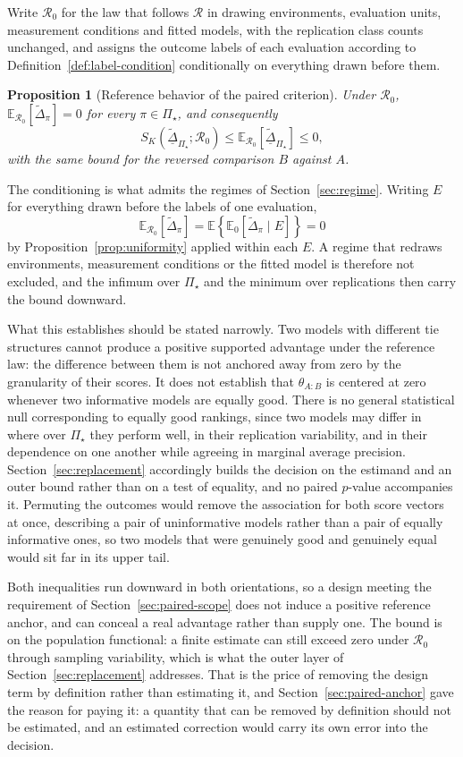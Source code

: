 \documentclass[11pt]{article}
\newcommand{\Regime}{\mathcal{R}}
\newcommand{\PSet}{\Pi_\star}
\newcommand{\E}{\mathbb{E}}
\newcommand{\Dta}{\widetilde{\Delta}}
\newcommand{\RobDta}{\underline{\widetilde{\Delta}}_{\PSet}}
\newtheorem{proposition}{Proposition}
\theoremstyle{remark}
\begin{document}
Write $\Regime_0$ for the law that follows $\Regime$ in drawing environments, evaluation units, measurement conditions and fitted models, with the replication class counts unchanged, and assigns the outcome labels of each evaluation according to Definition~\ref{def:label-condition} conditionally on everything drawn before them.

\begin{proposition}[Reference behavior of the paired criterion]
\label{prop:conservative}
Under $\Regime_0$, $\E_{\Regime_0}[\Dta_\pi]=0$ for every $\pi\in\PSet$, and consequently
\[
S_K(\RobDta;\Regime_0)
\leq
\E_{\Regime_0}[\RobDta]
\leq
0 ,
\]
with the same bound for the reversed comparison $B$ against $A$.
\end{proposition}

The conditioning is what admits the regimes of Section~\ref{sec:regime}. Writing $E$ for everything drawn before the labels of one evaluation,
\[
\E_{\Regime_0}\left[\Dta_\pi\right]
=
\E\left\{
\E_0\left[\Dta_\pi\mid E\right]
\right\}
=
0
\]
by Proposition~\ref{prop:uniformity} applied within each $E$. A regime that redraws environments, measurement conditions or the fitted model is therefore not excluded, and the infimum over $\PSet$ and the minimum over replications then carry the bound downward.

What this establishes should be stated narrowly. Two models with different tie structures cannot produce a positive supported advantage under the reference law: the difference between them is not anchored away from zero by the granularity of their scores. It does not establish that $\theta_{A:B}$ is centered at zero whenever two informative models are equally good. There is no general statistical null corresponding to equally good rankings, since two models may differ in where over $\PSet$ they perform well, in their replication variability, and in their dependence on one another while agreeing in marginal average precision. Section~\ref{sec:replacement} accordingly builds the decision on the estimand and an outer bound rather than on a test of equality, and no paired $p$-value accompanies it. Permuting the outcomes would remove the association for both score vectors at once, describing a pair of uninformative models rather than a pair of equally informative ones, so two models that were genuinely good and genuinely equal would sit far in its upper tail.

Both inequalities run downward in both orientations, so a design meeting the requirement of Section~\ref{sec:paired-scope} does not induce a positive reference anchor, and can conceal a real advantage rather than supply one. The bound is on the population functional: a finite estimate can still exceed zero under $\Regime_0$ through sampling variability, which is what the outer layer of Section~\ref{sec:replacement} addresses. That is the price of removing the design term by definition rather than estimating it, and Section~\ref{sec:paired-anchor} gave the reason for paying it: a quantity that can be removed by definition should not be estimated, and an estimated correction would carry its own error into the decision.
\end{document}
